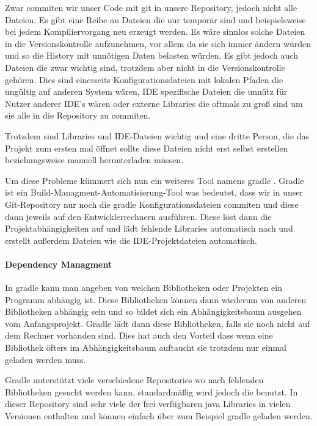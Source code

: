 
Zwar commiten wir unser Code mit git in unsere Repository, jedoch nicht alle Dateien. Es gibt eine Reihe an Dateien die nur temporär sind und beispielsweise bei jedem Kompiliervorgang neu erzeugt werden. Es wäre sinnlos solche Dateien in die Versionskontrolle aufzunehmen, vor allem da sie sich immer ändern würden und so die History mit unnötigen Daten belasten würden. Es gibt jedoch auch Dateien die zwar wichtig sind, trotzdem aber nicht in die Versionskontrolle gehören. Dies sind einerseits Konfigurationsdateien mit lokalen Pfaden die ungültig auf anderen System wären, IDE spezifische Dateien die unnütz für Nutzer anderer IDE's wären oder externe Libraries die oftmals zu groß sind um sie alle in die Repository zu commiten.

Trotzdem sind Libraries und IDE-Dateien wichtig und eine dritte Person, die das Projekt zum ersten mal öffnet sollte diese Dateien nicht erst selbst erstellen beziehungsweise manuell herunterladen müssen.

Um diese Probleme kümmert sich nun ein weiteres Tool namens gradle \cite{GRADLE}. Gradle ist ein Build-Managment-Automatisierung-Tool was bedeutet, dass wir in unser Git-Repository nur noch die gradle Konfigurationsdateien commiten und diese dann jeweils auf den Entwicklerrechnern ausführen. Diese löst dann die Projektabhängigkeiten auf und lädt fehlende Libraries automatisch nach und erstellt außerdem Dateien wie die IDE-Projektdateien automatisch.

\paragraph{Dependency Managment}

In gradle kann man angeben von welchen Bibliotheken oder Projekten ein Programm abhängig ist. Diese Bibliotheken können dann wiederum von anderen Bibliotheken abhängig sein und so bildet sich ein Abhängigkeitsbaum ausgehen vom Anfangsprojekt.
Gradle lädt dann diese Bibliotheken, falls sie noch nicht auf dem Rechner vorhanden sind. Dies hat auch den Vorteil dass wenn eine Bibliothek öfters im Abhängigkeitsbaum auftaucht sie trotzdem nur einmal geladen werden muss.

Gradle unterstützt viele verschiedene Repositories wo nach fehlenden Bibliotheken gesucht werden kann, standardmäßig wird jedoch die  \cite{MCENTRAL} benutzt.
In dieser Repository sind sehr viele der frei verfügbaren java Libraries in vielen Versionen enthalten und können einfach über zum Beispiel gradle geladen werden.

